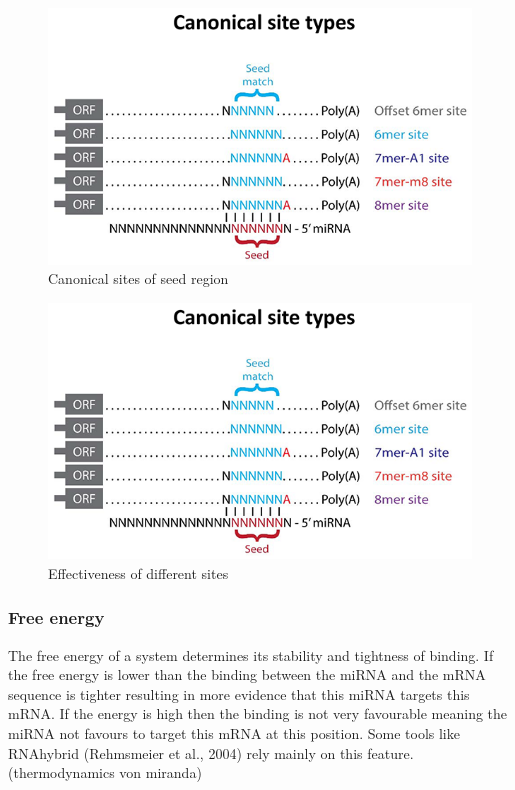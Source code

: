\documentclass[12pt]{article}
\begin{document}
\begin{figure}
\centering
\includegraphics[width=\textwidth]{results/canonical_sites.png}
\caption{Canonical sites of seed region}
\label{Fig:canonical}
\end{figure}


\begin{figure}
\includegraphics[scale=1]{results/canonical_sites.png}
\caption{Effectiveness of different sites}
\label{types}
\end{figure}

\subsubsection{Free energy}
The free energy of a system determines its stability and tightness of binding. If the free energy is lower than the binding between the miRNA and the mRNA sequence is tighter resulting in more evidence that this miRNA targets this mRNA. If the energy is high then the binding is not very favourable meaning the miRNA not favours to target this mRNA at this position. Some tools like RNAhybrid (Rehmsmeier et al., 2004) rely mainly on this feature. (thermodynamics von miranda)
 
\end{document}
